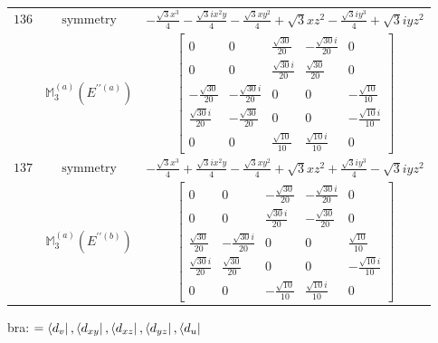 \documentclass[fleqn,8pt,landscape]{jsarticle}
\begin{document}
\begin{longtable}{ccc}
$ 136 $ & $ \text{symmetry} $ & $ - \frac{\sqrt{3} x^{3}}{4} - \frac{\sqrt{3} i x^{2} y}{4} - \frac{\sqrt{3} x y^{2}}{4} + \sqrt{3} x z^{2} - \frac{\sqrt{3} i y^{3}}{4} + \sqrt{3} i y z^{2} $ \\
$  $ & $ \mathbb{M}_{3}^{(a)}(E^{\prime\prime(a)}) $ & $ \begin{bmatrix} 0 & 0 & \frac{\sqrt{30}}{20} & - \frac{\sqrt{30} i}{20} & 0 \\ 0 & 0 & \frac{\sqrt{30} i}{20} & \frac{\sqrt{30}}{20} & 0 \\ - \frac{\sqrt{30}}{20} & - \frac{\sqrt{30} i}{20} & 0 & 0 & - \frac{\sqrt{10}}{10} \\ \frac{\sqrt{30} i}{20} & - \frac{\sqrt{30}}{20} & 0 & 0 & - \frac{\sqrt{10} i}{10} \\ 0 & 0 & \frac{\sqrt{10}}{10} & \frac{\sqrt{10} i}{10} & 0 \end{bmatrix} $ \\ \hline
$ 137 $ & $ \text{symmetry} $ & $ - \frac{\sqrt{3} x^{3}}{4} + \frac{\sqrt{3} i x^{2} y}{4} - \frac{\sqrt{3} x y^{2}}{4} + \sqrt{3} x z^{2} + \frac{\sqrt{3} i y^{3}}{4} - \sqrt{3} i y z^{2} $ \\
$  $ & $ \mathbb{M}_{3}^{(a)}(E^{\prime\prime(b)}) $ & $ \begin{bmatrix} 0 & 0 & - \frac{\sqrt{30}}{20} & - \frac{\sqrt{30} i}{20} & 0 \\ 0 & 0 & \frac{\sqrt{30} i}{20} & - \frac{\sqrt{30}}{20} & 0 \\ \frac{\sqrt{30}}{20} & - \frac{\sqrt{30} i}{20} & 0 & 0 & \frac{\sqrt{10}}{10} \\ \frac{\sqrt{30} i}{20} & \frac{\sqrt{30}}{20} & 0 & 0 & - \frac{\sqrt{10} i}{10} \\ 0 & 0 & - \frac{\sqrt{10}}{10} & \frac{\sqrt{10} i}{10} & 0 \end{bmatrix} $ \\ \hline
\end{longtable}
bra: $=\bra{d_{v}}, \bra{d_{xy}}, \bra{d_{xz}}, \bra{d_{yz}}, \bra{d_{u}}$
\end{document}
